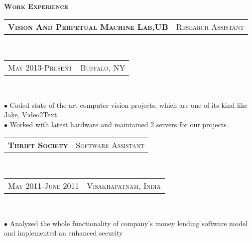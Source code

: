 \documentclass[10pt,a4paper,oneside]{article}
\begin{document}
    \begin{minipage}[t]{0.63\textwidth}
        \vspace{0pt}
        \textcolor{light-gray}{\textbf{\large W\textsc{ork} E\textsc{xperience}}}
        \vspace{10pt}\\
        \begin{tabular}{c|c}
            \textbf{\normalsize V\textsc{ision} A\textsc{nd} P\textsc{erpetual} M\textsc{achine} L\textsc{ab},UB}
            &\textmd{\normalsize R\textsc{esearch} A\textsc{ssistant}}
        \end{tabular}\\
        \textcolor{light-gray}{
            \begin{tabular}{c|c}
                {\small M\textsc{ay 2013}-P\textsc{resent}}
               &{\small B\textsc{uffalo}, NY}
            \end{tabular}
        }\\ 
        \vspace{-4mm}
        \begin{adjustwidth}{7pt}{0pt}
            {\footnotesize $\bullet$ Coded state of the art computer vision projects, which are one of its kind like Jake, Video2Text.\\
            $\bullet$ Worked with latest hardware and maintained 2 servers for our projects. }\\
        \end{adjustwidth}
        \begin{tabular}{c|c}
            \textbf{\normalsize T\textsc{hrift} S\textsc{ociety}}
            &\textmd{\normalsize S\textsc{oftware} A\textsc{ssistant}}
        \end{tabular}\\
        \textcolor{light-gray}{
            \begin{tabular}{c|c}
                {\small M\textsc{ay 2011}-J\textsc{une 2011}}
                &{\small V\textsc{isakhapatnam}, I\textsc{ndia}}
            \end{tabular}
        }\\ 
        \vspace{-4mm}
        \begin{adjustwidth}{7pt}{0pt}
            {\footnotesize $\bullet$ Analyzed the whole functionality of company's money lending software model and implemented an enhanced security
}
\end{adjustwidth}
\end{minipage}
\end{document}

